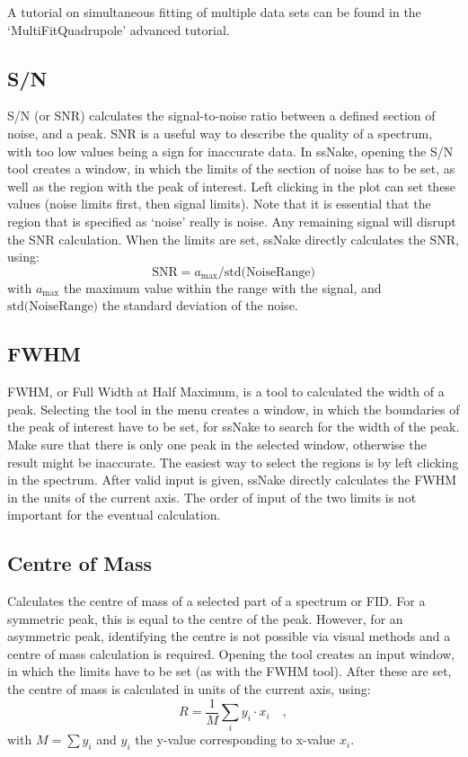 \documentclass[11pt,a4paper]{article}
\begin{document}
A tutorial on simultaneous fitting of multiple data sets can be found in the `MultiFitQuadrupole' advanced
tutorial. 

\subsection{S/N}
S/N (or SNR) calculates the signal-to-noise ratio between a defined section of noise, and a peak. SNR is a useful way to describe the quality of a spectrum, with too low values being a sign for inaccurate data. In ssNake, opening the S/N tool creates a window, in which the limits of the section of noise has to be set, as well as the region with the peak of interest. Left clicking in the plot can set these values (noise limits first, then signal limits). Note that it is essential that the region that is specified as `noise' really is noise. Any remaining signal will disrupt the SNR calculation. When the limits are set, ssNake directly calculates the SNR, using:
\begin{equation}
\text{SNR} = a_\text{max} / \text{std(NoiseRange)}
\end{equation}
with $a_\text{max}$ the maximum value within the range with the signal, and $\text{std(NoiseRange)}$ the standard deviation of the noise.

\subsection{FWHM}
FWHM, or Full Width at Half Maximum, is a tool to calculated the width of a peak. Selecting the tool in the menu creates a window, in which the boundaries of the peak of interest have to be set, for ssNake to search for the width of the peak. Make sure that there is only one peak in the selected window, otherwise the result might be inaccurate. The easiest way to select the regions is by left clicking in the spectrum. After valid input is given, ssNake directly calculates the FWHM in the units of the current axis. The order of input of the two limits is not important for the eventual calculation.

\subsection{Centre of Mass}
Calculates the centre of mass of a selected part of a spectrum or FID. For a symmetric peak, this is equal to the centre of the peak. However, for an asymmetric peak, identifying the centre is not possible via visual methods and a centre of mass calculation is required. Opening the tool creates an input window, in which the limits have to be set (as with the FWHM tool). After these are set, the centre of mass is calculated in units of the current axis, using:
\begin{equation}
R = \frac{1}{M} \sum_i y_i \cdot x_i  \quad,
\end{equation}
with $M = \sum y_i$ and $y_i$ the y-value corresponding to x-value $x_i$.
\end{document}

